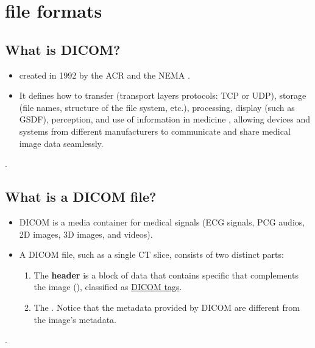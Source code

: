 \chapter{ file formats}

\section{What is DICOM?}
\begin{itemize}
\item {}
   created in 1992 by
  the \gls{ACR} and the \gls{NEMA} \cite{DICOM2025,wikipedia_DICOM}.
\item It defines how to transfer (transport layers protocols:
  \gls{TCP} or \gls{UDP}), storage (file names, structure of the
  file system, etc.), processing, display (such as \gls{GSDF}),
  perception, and use of information in medicine
  \cite{bushberg2011essential}, allowing devices and systems from
  different manufacturers to communicate and share medical image data
  seamlessly.
\end{itemize}.

\section{What is a DICOM file?}
\begin{itemize}
\item \gls{DICOM} is a media container for medical signals
  (\gls{ECG} signals, \gls{PCG} audios, 2D images, 3D images, and videos).
\item A DICOM file, such as a single CT slice, consists of two
  distinct parts:
  \begin{enumerate}
  \item The \textbf{header} is a block of data that contains specific
      that complements the image
    (), classified as
    \href{https://dicom.nema.org/medical/dicom/current/output/html/part06.html#PS3.6}{DICOM
      tags}.
  \item The . Notice that the metadata provided by \gls{DICOM} are
    different from the image's metadata.
  \end{enumerate}
\end{itemize}.

